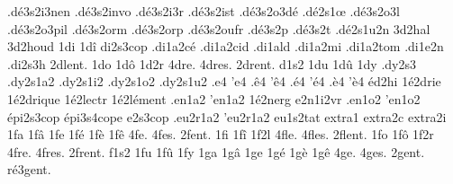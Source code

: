 {                    .dé3s2i3nen
                    .dé3s2invo
                    .dé3s2i3r
                    .dé3s2ist
                    .dé3s2o3dé
                    .dé2s1œ
                    .dé3s2o3l
                    .dé3s2o3pil
                    .dé3s2orm
                    .dé3s2orp
                    .dé3s2oufr
                    .dé3s2p %
                    .dé3s2t %
                    .dé2s1u2n
                    3d2hal
                    3d2houd
1di
1dî
                    di2s3cop
                    .di1a2cé
                    .di1a2cid
                    .di1ald
                    .di1a2mi
                    .di1a2tom
                    .di1e2n
                    .di2s3h
2dlent. %
1do
1dô
1d2r
4dre.
4dres.
2drent. %
d1s2
1du
1dû
1dy
                    .dy2s3
                    .dy2s1a2
                    .dy2s1i2
                    .dy2s1o2 %
                    .dy2s1u2
.e4
'e4
.ê4
'ê4
.é4
'é4
.è4
'è4
éd2hi %
                    1é2drie
                    1é2drique
                    1é2lectr
                    1é2lément
                    .en1a2
                    'en1a2
                    1é2nerg
                    e2n1i2vr
                    .en1o2
                    'en1o2
                    épi2s3cop
                    épi3s4cope
                    e2s3cop
                    .eu2r1a2
                    'eu2r1a2
                    eu1s2tat
                    extra1
                    extra2c
                    extra2i
1fa
1fâ
1fe
1fé
1fè
1fê
4fe.
4fes.
2fent. %
%
1fi
1fî
1f2l
4fle.
4fles.
2flent. %
1fo
1fô
1f2r
4fre.
4fres.
2frent. %
f1s2
1fu
1fû
1fy
1ga
1gâ
1ge
1gé
1gè
1gê
4ge.
4ges.
       2gent.
     ré3gent.
}
